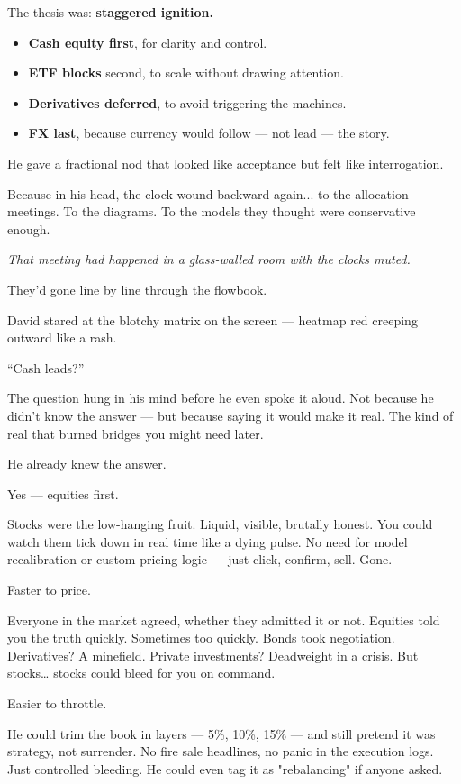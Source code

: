The thesis was: \textbf{staggered ignition.}

\begin{itemize}
\item \textbf{Cash equity first}, for clarity and control.
\item \textbf{ETF blocks} second, to scale without drawing attention.
\item \textbf{Derivatives deferred}, to avoid triggering the machines.
\item \textbf{FX last}, because currency would follow — not lead — the story.
\end{itemize}

He gave a fractional nod that looked like acceptance but felt like interrogation.

Because in his head, the clock wound backward again... to the allocation meetings.
To the diagrams.
To the models they thought were conservative enough.

\textit{That meeting had happened in a glass-walled room with the clocks muted.}

They’d gone line by line through the flowbook.

David stared at the blotchy matrix on the screen — heatmap red creeping outward like a rash.

“Cash leads?”

The question hung in his mind before he even spoke it aloud. Not because he didn’t know the answer — but because saying it would make it real. The kind of real that burned bridges you might need later.

He already knew the answer.

Yes — equities first.

Stocks were the low-hanging fruit. Liquid, visible, brutally honest. You could watch them tick down in real time like a dying pulse. No need for model recalibration or custom pricing logic — just click, confirm, sell. Gone.

Faster to price.

Everyone in the market agreed, whether they admitted it or not. Equities told you the truth quickly. Sometimes too quickly. Bonds took negotiation. Derivatives? A minefield. Private investments? Deadweight in a crisis. But stocks… stocks could bleed for you on command.

Easier to throttle.

He could trim the book in layers — 5\%, 10\%, 15\% — and still pretend it was strategy, not surrender. No fire sale headlines, no panic in the execution logs. Just controlled bleeding. He could even tag it as "rebalancing" if anyone asked.

